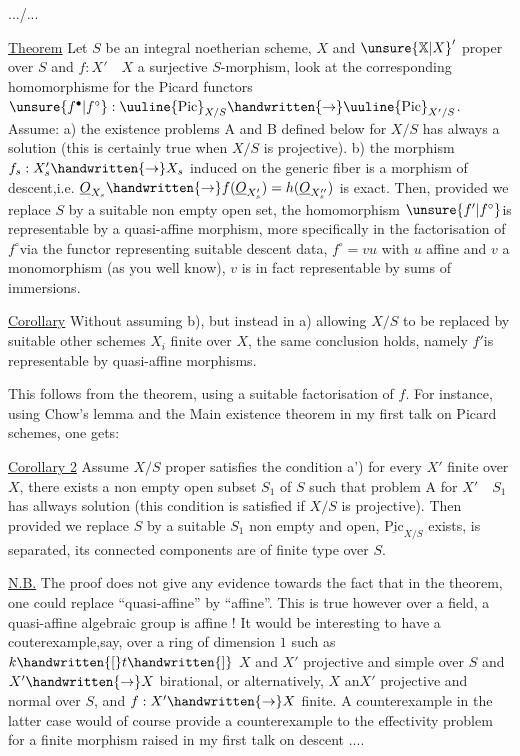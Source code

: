 \hfill .../...\par
\uline{Theorem} Let $S$ be an integral noetherian scheme, $X$ and $\unsure{\mathbb{X}|X}'$ proper over $S$ and $f:X'\quad X$ a surjective $S$-morphism, look at the corresponding homomorphisme for the Picard functors $\unsure{f^{\bullet}|f^{\circ}}:\text{\uuline{Pic}}_{X/S}\handwritten{\to}\text{\uuline{Pic}}_{X'/S}$. Assume: a) the existence problems A and B defined below for $X/S$ has always a solution (this is certainly true when $X/S$ is projective). b) the morphism $f_{s}:X'_{s}\handwritten{\to}X_{s}$ induced on the generic fiber is a morphism of descent,i.e. $\underline{O}_{X_{s}}\handwritten{\to}f(\underline{O}_{X'_{s}})=h(\underline{O}_{X''_{s}})$ is exact. Then, provided we replace $S$ by a suitable non empty open set, the homomorphism $\unsure{f'|f^{\circ}}$is representable by a quasi-affine morphism, more specifically \unsure{:|;} in the factorisation of $f^{\circ}$via the functor representing suitable descent data, $f^{\circ}=vu$ with $u$ affine and $v$ a monomorphism (as you well know), $v$ is in fact representable by   sums of immersions.

\uline{Corollary} Without assuming b), but instead in a) allowing $X/S$ to be replaced by suitable other schemes $X_{i}$ finite over $X$, the same conclusion  holds, namely $f'$is representable by quasi-affine morphisms.

This follows from the theorem, using a suitable factorisation of $f$. For instance, using Chow's lemma and the Main existence theorem in my first talk on Picard schemes, one gets:

\uline{Corollary 2} Assume $X/S$ proper satisfies the condition a') for every $X'$ finite over $X$, there exists a non empty open subset $S_{1}$ of $S$ such that problem A for $X'\quad S_{1}$ has allways solution  (this condition is satisfied if $X/S$ is projective). Then provided we replace $S$ by a suitable $S_{1}$ non empty and open, $\underline{\mathrm{Pic}}_{X/S}$ exists, is separated, its connected components are of finite type over $S$.

\uline{N.B.} The proof does not give any evidence towards the fact that in
the theorem, one could replace ``quasi-affine'' by ``affine''. This is true however over a field,  a quasi-affine algebraic group is affine ! It would be interesting to have a couterexample,say, over a ring of dimension $1$ such as $k\handwritten{[}t\handwritten{]}$\handwritten{,} $X$ and $X'$ projective and simple over $S$ and $X'\handwritten{\to}X$ birational, or alternatively, $X$ an$X'$ projective and normal over $S$, and $f:X'\handwritten{\to}X$ finite. A counterexample in the latter case would of course provide a counterexample to the effectivity problem for a finite morphism raised in my first talk on descent ....

